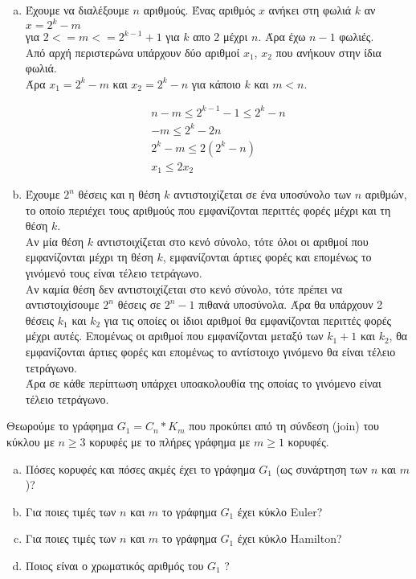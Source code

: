 \documentclass{assignment}
\begin{document}
\begin{enumerate}[(a)]

\item Έχουμε να διαλέξουμε $n$ αριθμούς. Ένας αριθμός $x$ ανήκει στη φωλιά $k$ αν $x = 2^k - m$ \\ 
για $2 <= m <= 2^{k-1}+1$ για $k$ απο 2 μέχρι $n$. Άρα έχω $n-1$ φωλιές.\\
Από αρχή περιστερώνα υπάρχουν δύο αριθμοί $x_1$, $x_2$ που ανήκουν στην ίδια φωλιά. \\
Άρα $x_1 = 2^k - m$ και $x_2 = 2^k - n$ για κάποιο $k$ και $m < n$.

\begin{gather*}
n-m \le 2^{k-1} - 1 \le 2^k - n\\
-m \le 2^k - 2n \\
2^k - m \le 2(2^k - n) \\
x_1 \le 2x_2
\end{gather*}

\item Έχουμε $2^n$ θέσεις και η θέση $k$ αντιστοιχίζεται σε ένα υποσύνολο των $n$ αριθμών, το οποίο
περιέχει τους αριθμούς που εμφανίζονται περιττές φορές μέχρι και τη θέση $k$. \\
Αν μία θέση $k$ αντιστοιχίζεται στο κενό σύνολο, τότε όλοι οι αριθμοί που εμφανίζονται μέχρι τη θέση $k$,
εμφανίζονται άρτιες φορές και επομένως το γινόμενό τους είναι τέλειο τετράγωνο. \\
Αν καμία θέση δεν αντιστοιχίζεται στο κενό σύνολο, τότε πρέπει να αντιστοιχίσουμε $2^n$ θέσεις 
σε $2^n - 1$ πιθανά υποσύνολα. Άρα θα υπάρχουν 2 θέσεις $k_1$ και $k_2$ για τις οποίες οι ίδιοι αριθμοί
θα εμφανίζονται περιττές φορές μέχρι αυτές. Επομένως οι αριθμοί που εμφανίζονται μεταξύ των $k_1+1$ και $k_2$,
θα εμφανίζονται άρτιες φορές και επομένως το αντίστοιχο γινόμενο θα είναι τέλειο τετράγωνο.\\
Άρα σε κάθε περίπτωση υπάρχει υποακολουθία της οποίας το γινόμενο είναι τέλειο τετράγωνο.

\end{enumerate}


Θεωρούμε το γράφημα $G_1 = C_n * K_m$ που προκύπει από τη σύνδεση (\textlatin{join}) του κύκλου με 
$n \ge 3$ κορυφές με το πλήρες γράφημα με $m \ge 1$ κορυφές.

\begin{enumerate}[(a)]

\item 
Πόσες κορυφές και πόσες ακμές έχει το γράφημα $G_1$ (ως συνάρτηση των $n$ και $m$)?
\item
Για ποιες τιμές των $n$ και $m$ το γράφημα $G_1$ έχει κύκλο \textlatin{Euler}?
\item
Για ποιες τιμές των $n$ και $m$ το γράφημα $G_1$ έχει κύκλο \textlatin{Hamilton}?
\item
Ποιος είναι ο χρωματικός αριθμός του $G_1$ ?

\end{enumerate}
\end{document}
